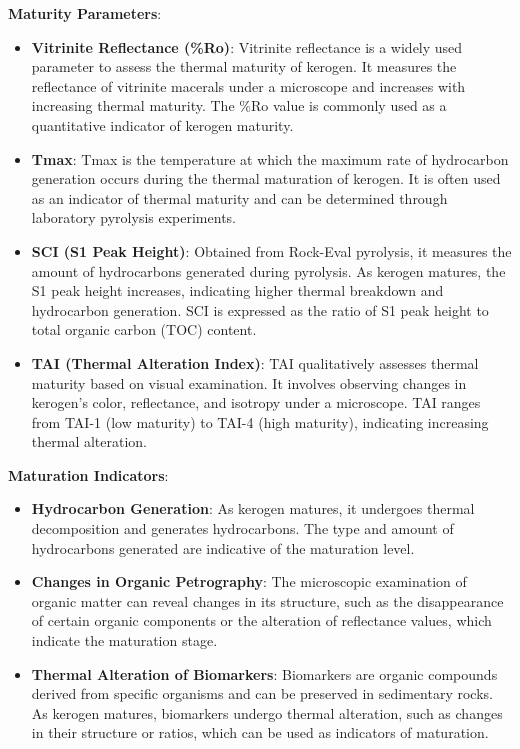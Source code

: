 \documentclass{article}
\begin{document}
\textbf{Maturity Parameters}:
    \begin{itemize}
        \item \textbf{Vitrinite Reflectance (\%Ro)}: Vitrinite reflectance is a widely used parameter to assess the thermal maturity of kerogen. It measures the reflectance of vitrinite macerals under a microscope and increases with increasing thermal maturity. The \%Ro value is commonly used as a quantitative indicator of kerogen maturity.
        \item \textbf{Tmax}: Tmax is the temperature at which the maximum rate of hydrocarbon generation occurs during the thermal maturation of kerogen. It is often used as an indicator of thermal maturity and can be determined through laboratory pyrolysis experiments.
        \item \textbf{SCI (S1 Peak Height)}: Obtained from Rock-Eval pyrolysis, it measures the amount of hydrocarbons generated during pyrolysis. As kerogen matures, the S1 peak height increases, indicating higher thermal breakdown and hydrocarbon generation. SCI is expressed as the ratio of S1 peak height to total organic carbon (TOC) content.
        \item \textbf{TAI (Thermal Alteration Index)}: TAI qualitatively assesses thermal maturity based on visual examination. It involves observing changes in kerogen's color, reflectance, and isotropy under a microscope. TAI ranges from TAI-1 (low maturity) to TAI-4 (high maturity), indicating increasing thermal alteration.
    \end{itemize}

\textbf{Maturation Indicators}:
    \begin{itemize}
        \item \textbf{Hydrocarbon Generation}: As kerogen matures, it undergoes thermal decomposition and generates hydrocarbons. The type and amount of hydrocarbons generated are indicative of the maturation level.
        \item \textbf{Changes in Organic Petrography}: The microscopic examination of organic matter can reveal changes in its structure, such as the disappearance of certain organic components or the alteration of reflectance values, which indicate the maturation stage.
        \item \textbf{Thermal Alteration of Biomarkers}: Biomarkers are organic compounds derived from specific organisms and can be preserved in sedimentary rocks. As kerogen matures, biomarkers undergo thermal alteration, such as changes in their structure or ratios, which can be used as indicators of maturation.
    \end{itemize}
\end{document}
